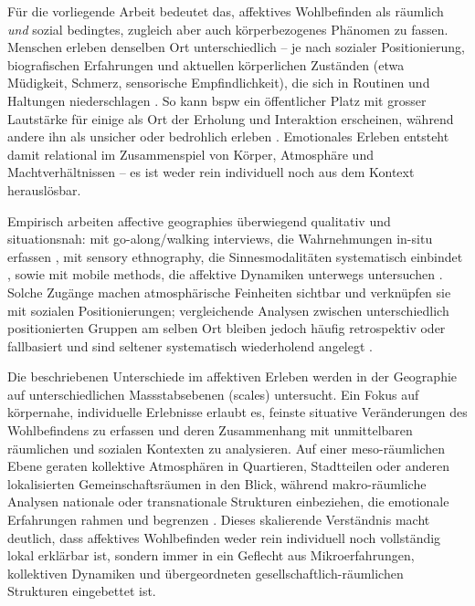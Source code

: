 Für die vorliegende Arbeit bedeutet das, affektives Wohlbefinden als räumlich \emph{und} sozial bedingtes, zugleich aber auch körperbezogenes Phänomen zu fassen. Menschen erleben denselben Ort unterschiedlich -- je nach sozialer Positionierung, biografischen Erfahrungen und aktuellen körperlichen Zuständen (etwa Müdigkeit, Schmerz, sensorische Empfindlichkeit), die sich in Routinen und Haltungen niederschlagen \parencite{mccormackEngineeringAffectiveAtmospheres2008,bissellPassengerMobilitiesAffective2010,ahmedPhenomenologyWhiteness2007}. So kann \gls{bspw} ein öffentlicher Platz mit grosser Lautstärke für einige als Ort der Erholung und Interaktion erscheinen, während andere ihn als unsicher oder bedrohlich erleben \parencite{collectiveSafeSpaceReconceptualization2014}. Emotionales Erleben entsteht damit relational im Zusammenspiel von Körper, Atmosphäre und Machtverhältnissen -- es ist weder rein individuell noch aus dem Kontext herauslösbar.

Empirisch arbeiten affective geographies überwiegend qualitativ und situationsnah: mit go-along/walking interviews, die Wahrnehmungen in-situ erfassen \parencite{kusenbachStreetPhenomenologyGoAlong2003}, mit sensory ethnography, die Sinnesmodalitäten systematisch einbindet \parencite{pinkDoingSensoryEthnography2009}, sowie mit mobile methods, die affektive Dynamiken unterwegs untersuchen \parencite{buscherIntroductionMobileMethods2010}. Solche Zugänge machen atmosphärische Feinheiten sichtbar und verknüpfen sie mit sozialen Positionierungen; vergleichende Analysen zwischen unterschiedlich positionierten Gruppen am selben Ort bleiben jedoch häufig retrospektiv oder fallbasiert und sind seltener systematisch wiederholend angelegt \parencite{hoSocialGeographyIII2024}.

Die beschriebenen Unterschiede im affektiven Erleben werden in der Geographie auf unterschiedlichen Massstabsebenen (scales) untersucht. Ein Fokus auf körpernahe, individuelle Erlebnisse erlaubt es, feinste situative Veränderungen des Wohlbefindens zu erfassen und deren Zusammenhang mit unmittelbaren räumlichen und sozialen Kontexten zu analysieren. Auf einer meso-räumlichen Ebene geraten kollektive Atmosphären in Quartieren, Stadtteilen oder anderen lokalisierten Gemeinschaftsräumen in den Blick, während makro-räumliche Analysen nationale oder transnationale Strukturen einbeziehen, die emotionale Erfahrungen rahmen und begrenzen \parencite{howittScaleRelationMusical1998,marstonHumanGeographyScale2005}. Dieses skalierende Verständnis macht deutlich, dass affektives Wohlbefinden weder rein individuell noch vollständig lokal erklärbar ist, sondern immer in ein Geflecht aus Mikroerfahrungen, kollektiven Dynamiken und übergeordneten gesellschaftlich-räumlichen Strukturen eingebettet ist.

